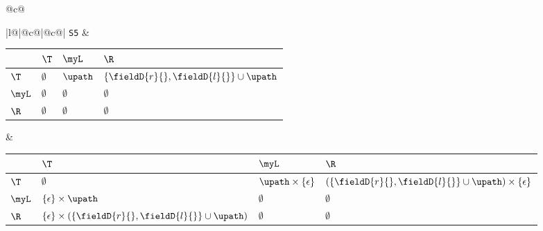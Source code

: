 \begin{figure}
{\begin{tabular}{@{}c@{}}
{\begin{tabular}[b]{|l@{}|@{}c@{}|@{}c@{}|}
{\tt S5} & 
\begin{tabular}{|p{3mm}|p{22mm}p{22mm}p{22mm}|} \hline
            & $\T$  		& $\myL$ 		& $\R$ 	 \\ \hline
  $\T$ 		& $\emptyset$	& $\upath$	& $\{\fieldD{r}{}, \fieldD{l}{}\} \cup \upath$ \\ \hline
  $\myL$ 	& $\emptyset$	& $\emptyset$	& $\emptyset$	\\ \hline
  $\R$ 		& $\emptyset$	& $\emptyset$	& $\emptyset$	\\ \hline
\end{tabular}
 &
\begin{tabular}{|p{3mm}|p{35mm}p{35mm}p{35mm}|} \hline 
            & $\T$  		& $\myL$ 		& $\R$ 	 \\ \hline
  $\T$ 		& $\emptyset$	& $\upath \times \{\epsilon\}$	& $(\{\fieldD{r}{}, \fieldD{l}{}\} \cup \upath) \times \{\epsilon\}$ \\ \hline
  $\myL$ 	& $\{\epsilon\} \times \upath$	& $\emptyset$	& $\emptyset$	\\ \hline
  $\R$ 		& $\{\epsilon\} \times (\{\fieldD{r}{}, \fieldD{l}{}\} \cup \upath)$	& $\emptyset$	& $\emptyset$	\\ \hline
\end{tabular} \\ \hline


\end{tabular}}
\end{tabular}}
\end{figure}
